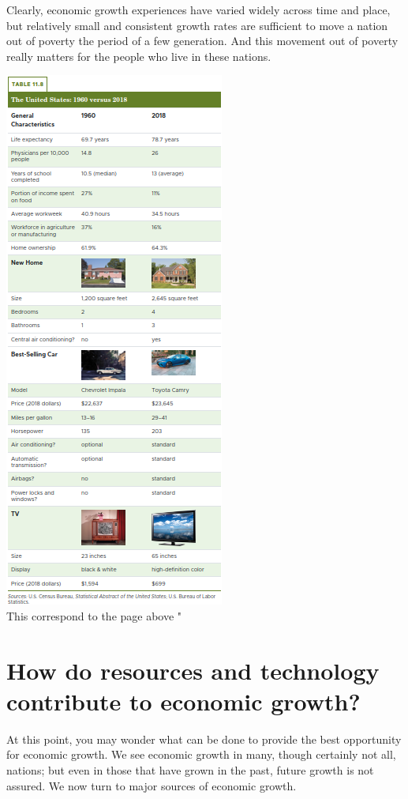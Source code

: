 \documentclass[11pt]{article} %
\begin{document}
Clearly, economic growth experiences have varied widely across time and place, but relatively small and consistent growth rates are sufficient to move a nation out of poverty the period of a few generation. And this movement out of poverty really matters for the people who live in these nations.
\begin{center}
\includegraphics[scale=0.5]{../../images/Chapter 11/Table 11.8.png} \\ This correspond to the page above "%
\end{center}

\newpage

\section*{How do resources and technology contribute to economic growth?}
At this point, you may wonder what can be done to provide the best opportunity for economic growth. We see economic growth in many, though certainly not all, nations; but even in those that have grown in the past, future growth is not assured. We now turn to major sources of economic growth.
\end{document}
